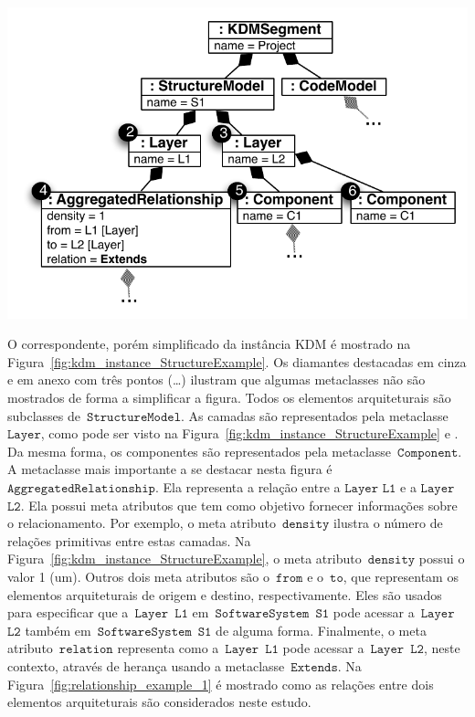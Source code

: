 \begin{minipage}{.55\textwidth}
	\centering
	\includegraphics[scale=0.67]{images/StructureKDMINstance}
	\label{fig:kdm_instance_StructureExample}
\end{minipage}


O correspondente, porém simplificado da instância KDM é mostrado na Figura~\ref{fig:kdm_instance_StructureExample}. Os diamantes destacadas em cinza e em anexo com três pontos (\ldots) ilustram que algumas metaclasses não são mostrados de forma a simplificar a figura. Todos os elementos arquiteturais são subclasses de~$\mathtt{StructureModel}$. As camadas são representados pela metaclasse~$\mathtt{Layer}$, como pode ser visto na Figura~\ref{fig:kdm_instance_StructureExample}  e . Da mesma forma, os componentes são representados pela metaclasse~$\mathtt{Component}$. A metaclasse mais importante a se destacar nesta figura é $\mathtt{AggregatedRelationship}$. Ela representa a relação entre a $\mathtt{Layer}$ $\mathtt{L1}$ e a $\mathtt{Layer}$ $\mathtt{L2}$. Ela possui meta atributos que tem como objetivo fornecer informações sobre o relacionamento. Por exemplo, o meta atributo~$\mathtt{density}$ ilustra o número de relações primitivas entre estas camadas. Na Figura~\ref{fig:kdm_instance_StructureExample}, o meta atributo~$\mathtt{density}$ possui o valor 1 (um). Outros dois meta atributos são o~$\mathtt{from}$ e o~$\mathtt{to}$, que representam os elementos arquiteturais de origem e destino, respectivamente. Eles são usados para especificar que a~$\mathtt{Layer}$~$\mathtt{L1}$ em~$\mathtt{SoftwareSystem}$~$\mathtt{S1}$ pode acessar a~$\mathtt{Layer}$~$\mathtt{L2}$ também em~$\mathtt{SoftwareSystem}$~$\mathtt{S1}$ de alguma forma. Finalmente, o meta atributo~$\mathtt{relation}$ representa como a~$\mathtt{Layer}$~$\mathtt{L1}$ pode acessar a~$\mathtt{Layer}$~$\mathtt{L2}$, neste contexto, através de herança usando a metaclasse~$\mathtt{Extends}$. Na Figura~\ref{fig:relationship_example_1} é mostrado como as relações entre dois elementos arquiteturais são considerados neste estudo.

